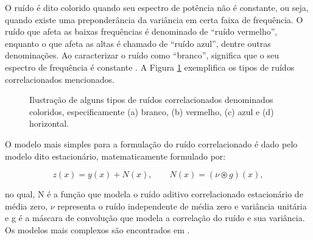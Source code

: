 O ruído é dito colorido quando seu espectro de potência não é constante, ou seja, quando existe uma preponderância da variância em certa faixa de frequência. O ruído que afeta as baixas frequências é denominado de ``ruído vermelho'', enquanto o que afeta as altas é chamado de ``ruído azul'', dentre outras denominações. Ao caracterizar o ruído como ``branco'', significa que o seu espectro de frequência é constante \cite{marshall2017handbook,bertalmiodenoising2018}. A Figura \ref{fig:imgCapRuidoColoredNoise} exemplifica os tipos de ruídos correlacionados mencionados.


\begin{figure}[H]
	\centering
	
	\caption{Ilustração de alguns tipos de ruídos correlacionados denominados coloridos, especificamente (a) branco, (b) vermelho, (c) azul e (d) horizontal.}
	
	\hfil
	\hfil
	\hfil
	
	\label{fig:imgCapRuidoColoredNoise}
\end{figure}


O modelo mais simples para a formulação do ruído correlacionado é dado pelo modelo dito estacionário, matematicamente formulado por:

\begin{equation}
z(x) =  y(x) + N(x), \qquad N(x) = (\nu\circledast g)(x),
\label{eq:eqCapRuidoCorrelatedNoiseStationary}
\end{equation}

\noindent no qual, N é a função que modela o ruído aditivo correlacionado estacionário de média zero, $\nu$ representa o ruído independente de média zero e variância unitária e g é a máscara de convolução que modela a correlação do ruído e sua variância. Os modelos mais complexos são encontrados em .





      


